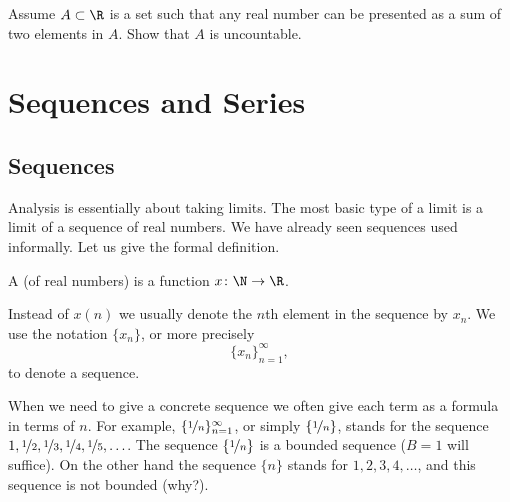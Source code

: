 \documentclass[12pt]{book}
\begin{document}
\begin{exercise}
Assume $A\subset \R$ is a set such that any real number can be presented as a sum of two elements in $A$. 
Show that $A$ is uncountable.
\end{exercise}






\chapter{Sequences and Series} \label{seq:chapter}


\section{Sequences}
\label{sec:seqsandlims}


Analysis is essentially about taking limits.
The most basic type of a limit
is a limit of a sequence of real numbers.
We have already seen sequences used informally.
Let us give the formal
definition.

\begin{defn}
A \emph{} (of real numbers) is a function $x \colon \N \to \R$.
\end{defn}


Instead of $x(n)$ we 
usually denote the $n$th element in the sequence by $x_n$.
We 
use the notation $\{ x_n \}$, or more precisely
\begin{equation*}
\{ x_n \}_{n=1}^\infty,
\end{equation*}
to denote a sequence.

When we need
to give a concrete sequence we often give each term as a formula in
terms of $n$.
For example, $\{ \nicefrac{1}{n} \}_{n=1}^\infty$, or simply $\{
\nicefrac{1}{n} \}$, stands for
the sequence $1, \nicefrac{1}{2}, \nicefrac{1}{3}, \nicefrac{1}{4},
\nicefrac{1}{5}, \ldots$.
The sequence $\{ \nicefrac{1}{n} \}$
is a bounded sequence ($B=1$ will
suffice).
On the other hand the sequence $\{ n \}$ stands for
$1,2,3,4,\ldots$, and this sequence is not bounded (why?).
\end{document}
